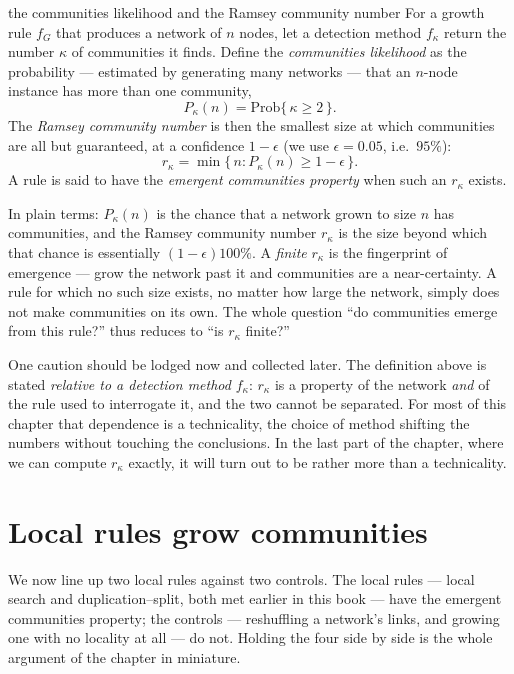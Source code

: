 \begin{calculation}{the communities likelihood and the Ramsey community number}
For a growth rule $f_G$ that produces a network of $n$ nodes, let a detection
method $f_\kappa$ return the number $\kappa$ of communities it finds. Define the
\emph{communities likelihood} as the probability --- estimated by generating many
networks --- that an $n$-node instance has more than one community,
\begin{equation}
  P_\kappa(n) = \mathrm{Prob}\big\{\, \kappa \ge 2 \,\big\}.
  \label{eq:com-pk}
\end{equation}
The \emph{Ramsey community number} is then the smallest size at which communities
are all but guaranteed, at a confidence $1-\epsilon$ (we use $\epsilon=0.05$,
i.e.\ $95\%$):
\begin{equation}
  r_\kappa = \min\{\, n : P_\kappa(n) \ge 1-\epsilon \,\}.
  \label{eq:com-rk}
\end{equation}
A rule is said to have the \emph{emergent communities property} when such an
$r_\kappa$ exists.
\end{calculation}

In plain terms: $P_\kappa(n)$ is the chance that a network grown to size $n$ has
communities, and the Ramsey community number $r_\kappa$ is the size beyond which
that chance is essentially $(1-\epsilon)100\%$. A \emph{finite} $r_\kappa$ is the fingerprint
of emergence --- grow the network past it and communities are a near-certainty. A
rule for which no such size exists, no matter how large the network, simply does
not make communities on its own. The whole question ``do communities emerge from
this rule?'' thus reduces to ``is $r_\kappa$ finite?''

One caution should be lodged now and collected later. The definition above is
stated \emph{relative to a detection method} $f_\kappa$: $r_\kappa$ is a property
of the network \emph{and} of the rule used to interrogate it, and the two cannot
be separated. For most of this chapter that dependence is a technicality, the
choice of method shifting the numbers without touching the conclusions. In the
last part of the chapter, where we can compute $r_\kappa$ exactly, it will turn
out to be rather more than a technicality.

\section{Local rules grow communities}

We now line up two local rules against two controls. The local rules --- local
search and duplication--split, both met earlier in this book --- have the emergent
communities property; the controls --- reshuffling a network's links, and growing
one with no locality at all --- do not. Holding the four side by side is the whole
argument of the chapter in miniature.

